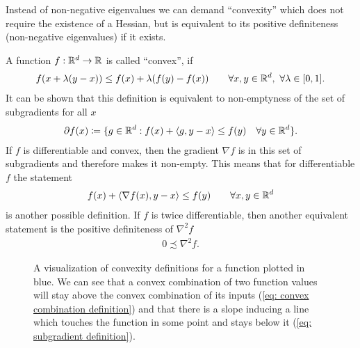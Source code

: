 Instead of non-negative eigenvalues we can demand ``convexity'' which does
not require the existence of a Hessian, but is equivalent to its positive
definiteness (non-negative eigenvalues) if it exists.
%
\begin{definition}[Convexity]\label{def: convexity}
	A function \(f:\mathbb{R}^d\to \mathbb{R}\) is called ``convex'', if 
	\begin{align}\label{eq: convex combination definition}
		f(x + \hesseEV(y-x)) \le f(x) + \hesseEV (f(y)-f(x))
		\qquad \forall x,y\in\reals^\dimension,\ \forall\hesseEV\in[0,1].
	\end{align}
	It can be shown \parencite[e.g.][Prop.
	1.1]{bubeckConvexOptimizationAlgorithms2015} that this definition is
	equivalent to non-emptyness of the set of subgradients for all \(x\)
	\begin{align}\label{eq: subgradient definition}
		\partial f(x) \coloneqq \{
			g \in\mathbb{R}^d: f(x) + \langle g, y-x\rangle \le f(y)
			\quad \forall y\in\mathbb{R}^d
		\}.
	\end{align}
	If \(f\) is differentiable and convex, then the gradient \(\nabla f\) is in
	this set of subgradients \parencite[e.g.][Prop.
	1.1]{bubeckConvexOptimizationAlgorithms2015} and therefore makes it non-empty.
	This means that for differentiable \(f\) the statement
	\begin{align*}
		f(x) + \langle\nabla f(x), y-x\rangle \le f(y)\qquad \forall x,y\in\mathbb{R}^d
	\end{align*}
	is another possible definition. If \(f\) is twice differentiable, then another
	equivalent statement \parencite[e.g.][Theorem
	2.1.4]{nesterovLecturesConvexOptimization2018} is the positive definiteness
	of \(\nabla^2 f\)
	\begin{align*}
		0\precsim\nabla^2 f.
	\end{align*}
\end{definition}
%
\begin{figure}[h]
	\centering
	\def\svgwidth{1\textwidth}
	
	\caption{
		A visualization of convexity definitions for a function plotted in blue.
		We can see that a convex combination of two function values will stay
		above the convex combination of its inputs
		(\ref{eq: convex combination definition}) and that there is a slope inducing
		a line which touches the function in some point and stays below it
		(\ref{eq: subgradient definition}).
	}
	\label{fig: visualize convexity definition}
\end{figure}
%
